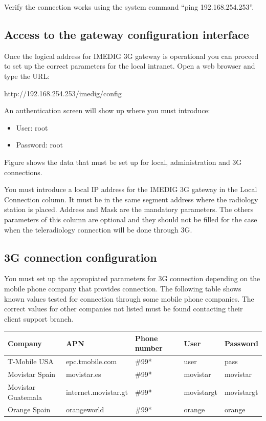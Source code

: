 \documentclass{plantilla-manual-usuario-en}
\begin{document}
Verify the connection works using the system command ``ping 192.168.254.253''. 

\subsection{Access to the gateway configuration interface} \label{labelInterfaceConfiguracion}

Once the logical address for IMEDIG 3G gateway is operational you can proceed to set up the correct parameters for the local intranet. Open a web browser and type the URL:

http://192.168.254.253/imedig/config

An authentication screen will show up where you must introduce:

\begin{itemize}
\item User: root
\item Password: root
\end{itemize}

Figure  shows the data that must be set up for local, administration and 3G connections.


You must introduce a local IP address for the IMEDIG 3G gateway in the Local Connection column.  It must be in the same segment address where the radiology station is placed. Address and Mask are the mandatory parameters. The others parameters of this column are optional and they should not be filled for the case when the teleradiology connection will be done through 3G.

\subsection{3G connection configuration}

You must set up the appropiated parameters for 3G connection depending on the mobile phone company that provides connection. The following table shows known values tested for connection through some mobile phone companies. The correct values for other companies not listed must be found contacting their client support branch.


\begin{center}
  \begin{tabular}{ | l | l | l | l | l |}
    \hline
    Company & APN & Phone number & User & Password \\ \hline
	T-Mobile USA & epc.tmobile.com & \#99* & user & pass \\ \hline
	Movistar Spain & movistar.es & \#99* & movistar & movistar \\ \hline
	Movistar Guatemala & internet.movistar.gt & \#99* & movistargt & movistargt \\ \hline
	Orange Spain & orangeworld & \#99* & orange & orange \\ \hline
  \end{tabular}
\end{center}
\end{document}
